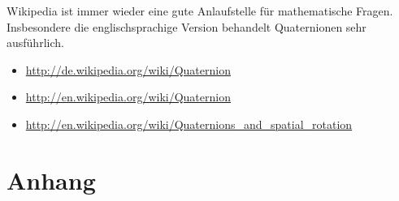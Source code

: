 \documentclass[12pt]{article}
\begin{document}
  Wikipedia ist immer wieder eine gute Anlaufstelle für mathematische Fragen. Insbesondere die englischsprachige Version behandelt Quaternionen sehr ausführlich.

  \begin{itemize}
    \item \url{http://de.wikipedia.org/wiki/Quaternion}
    \item \url{http://en.wikipedia.org/wiki/Quaternion}
    \item \url{http://en.wikipedia.org/wiki/Quaternions_and_spatial_rotation}
  \end{itemize}

  \appendix
  \section*{Anhang}
  \renewcommand{\thesubsection}{\Alph{subsection}}
\end{document}
